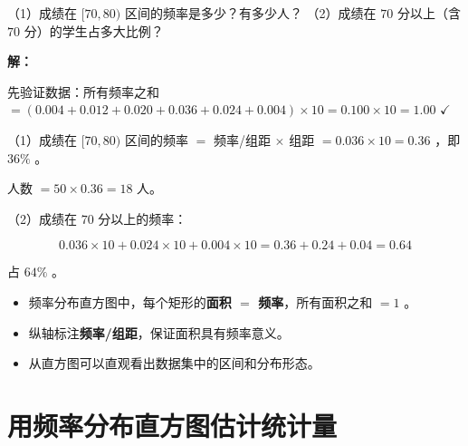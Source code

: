 \begin{workedexamples}
\begin{center}
\label{fig:freq-hist-exam}
\end{center}

（1）成绩在 $[70, 80)$ 区间的频率是多少？有多少人？
（2）成绩在 $70$ 分以上（含 $70$ 分）的学生占多大比例？

\textbf{解：}

先验证数据：所有频率之和 $= (0.004 + 0.012 + 0.020 + 0.036 + 0.024 + 0.004) \times 10 = 0.100 \times 10 = 1.00$ $\checkmark$

（1）成绩在 $[70, 80)$ 区间的频率 $=$ 频率/组距 $\times$ 组距 $= 0.036 \times 10 = 0.36$ ，即 $36\%$ 。

人数 $= 50 \times 0.36 = 18$ 人。

（2）成绩在 $70$ 分以上的频率：

\[
0.036 \times 10 + 0.024 \times 10 + 0.004 \times 10 = 0.36 + 0.24 + 0.04 = 0.64
\]


占 $64\%$ 。

\end{workedexamples}

\begin{keytakeaway}


\begin{itemize}
  \item 频率分布直方图中，每个矩形的\textbf{面积 $=$ 频率}，所有面积之和 $= 1$ 。
  \item 纵轴标注\textbf{频率/组距}，保证面积具有频率意义。
  \item 从直方图可以直观看出数据集中的区间和分布形态。
\end{itemize}


\end{keytakeaway}



\section*{用频率分布直方图估计统计量}


